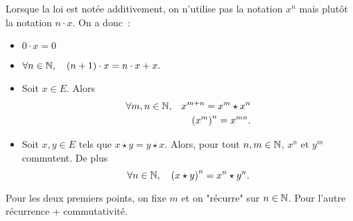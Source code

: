 \documentclass{magnolia}
\begin{document}
\begin{remarqueUnique}
\remarque Lorsque la loi est notée additivement, on n'utilise pas la notation $x^n$ mais plutôt la notation $n\cdot x$. On a donc~:
\begin{itemize}
\item $0\cdot x=0$
\item $\forall n\in\mathbb{N} ,\quad \left(n+1\right)\cdot x=n\cdot x+x.$
\end{itemize}
\end{remarqueUnique}

\begin{proposition}
\begin{itemize}
\item Soit $x\in E$. Alors
\begin{eqnarray*}
\forall m,n\in\mathbb{N}, & & x^{m+n}=x^m\star x^n\\
                 & & \left(x^m\right)^n=x^{mn}.
\end{eqnarray*}
\item Soit $x,y\in E$ tels que $x\star y=y\star x$. Alors, pour tout $n,m\in\mathbb{N}$, $x^n$ et $y^m$ commutent. De plus
\[\forall n\in\mathbb{N} ,\quad \left(x\star y\right)^n=x^n \star y^n.\]
\end{itemize}
\end{proposition}

\begin{preuve}
Pour les deux premiers points, on fixe $m$ et on "récurre" sur $n\in \mathbb{N}$.
Pour l'autre récurrence + commutativité.
\end{preuve}
\end{document}
